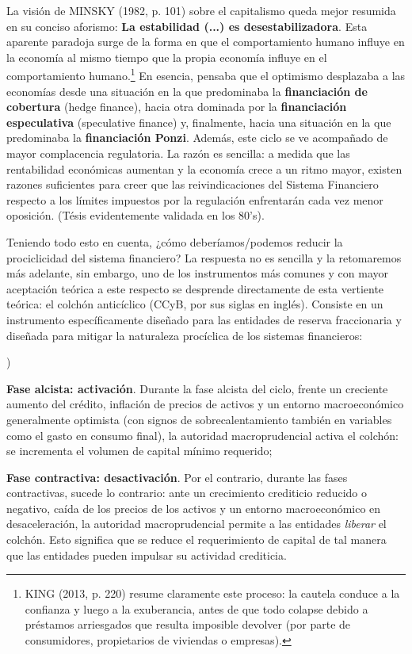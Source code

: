 \documentclass[10pt,a4paper]{article}
\newcounter{alphaitem}
\newenvironment{la}
      {\begin{list}{\alph{alphaitem})}{%
          \usecounter{alphaitem}%
          \setlength{\leftmargin}{1cm}%
          \setlength{\parskip}{3pt}%
          \setlength{\itemsep}{0pt}%
          \setlength{\parsep}{0pt}%
      }}
      {\end{list}}
\begin{document}
La visión de MINSKY (1982, p. 101) sobre el capitalismo queda mejor resumida en su conciso aforismo: \textbf{La estabilidad (...) es desestabilizadora}. Esta aparente paradoja surge de la forma en que el comportamiento humano influye en la economía al mismo tiempo que la propia economía influye en el comportamiento humano.\footnote{%
    KING (2013, p. 220) resume claramente este proceso: la cautela conduce a la confianza y luego a la exuberancia, antes de que todo colapse debido a préstamos arriesgados que resulta imposible devolver (por parte de consumidores, propietarios de viviendas o empresas).
} En esencia, pensaba que el optimismo desplazaba a las economías desde una situación en la que predominaba la \textbf{financiación de cobertura} (hedge finance), hacia otra dominada por la \textbf{financiación especulativa} (speculative finance) y, finalmente, hacia una situación en la que predominaba la \textbf{financiación Ponzi}. Además, este ciclo se ve acompañado de mayor complacencia regulatoria. La razón es sencilla: a medida que las rentabilidad económicas aumentan y la economía crece a un ritmo mayor, existen razones suficientes para creer que las reivindicaciones del Sistema Financiero respecto a los límites impuestos por la regulación enfrentarán cada vez menor oposición. (Tésis evidentemente validada en los 80's). 

Teniendo todo esto en cuenta, ¿cómo deberíamos/podemos reducir la prociclicidad del sistema financiero? La respuesta no es sencilla y la retomaremos más adelante, sin embargo, uno de los instrumentos más comunes y con mayor aceptación teórica a este respecto se desprende directamente de esta vertiente teórica: el colchón anticíclico (CCyB, por sus siglas en inglés). Consiste en un instrumento específicamente diseñado para las entidades de reserva fraccionaria y diseñada para mitigar la naturaleza procíclica de los sistemas financieros:
\begin{la}
    \item \textbf{Fase alcista: activación}. Durante la fase alcista del ciclo, frente un creciente aumento del crédito, inflación de precios de activos y un entorno macroeconómico generalmente optimista (con signos de sobrecalentamiento también en variables como el gasto en consumo final), la autoridad macroprudencial activa el colchón: se incrementa el volumen de capital mínimo requerido;
    \item \textbf{Fase contractiva: desactivación}. Por el contrario, durante las fases contractivas, sucede lo contrario: ante un crecimiento crediticio reducido o negativo, caída de los precios de los activos y un entorno macroeconómico en desaceleración, la autoridad macroprudencial permite a las entidades \textit{liberar} el colchón. Esto significa que se reduce el requerimiento de capital de tal manera que las entidades pueden impulsar su actividad crediticia. 
\end{la}
\end{document}
